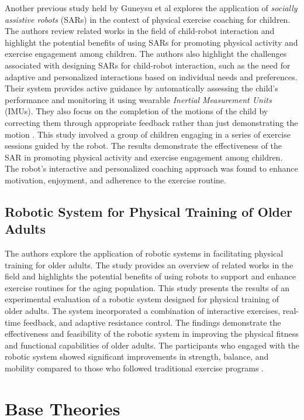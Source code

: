 Another previous study held by Guneysu et al explores the application of \emph{socially assistive robots} (SARs) in the context of physical exercise coaching for children.
The authors review related works in the field of child-robot interaction and highlight the potential benefits of using SARs for promoting physical activity and exercise engagement among children.
The authors also highlight the challenges associated with designing SARs for child-robot interaction, such as the need for adaptive and personalized interactions based on individual needs and preferences.
Their system provides active guidance by automatically assessing the child's performance and monitoring it using wearable \emph{Inertial Measurement Units} (IMUs).
They also focus on the completion of the motions of the child by correcting them through appropriate feedback rather than just demonstrating the motion \parencite{güneysu2017}.
This study involved a group of children engaging in a series of exercise sessions guided by the robot. The results demonstrate the effectiveness of the SAR in promoting physical activity and exercise engagement among children.
The robot's interactive and personalized coaching approach was found to enhance motivation, enjoyment, and adherence to the exercise routine.

\subsection{Robotic System for Physical Training of Older Adults}
\label{subsec:sars-for-adults}

The authors explore the application of robotic systems in facilitating physical training for older adults. The study provides an overview of related works in the field and highlights the potential benefits of using robots to support and enhance exercise routines for the aging population.
This study presents the results of an experimental evaluation of a robotic system designed for physical training of older adults.
The system incorporated a combination of interactive exercises, real-time feedback, and adaptive resistance control. The findings demonstrate the effectiveness and feasibility of the robotic system in improving the physical fitness and functional capabilities of older adults.
The participants who engaged with the robotic system showed significant improvements in strength, balance, and mobility compared to those who followed traditional exercise programs \parencite{avioz2021}.

\section{Base Theories}
\label{sec:base-theories}


